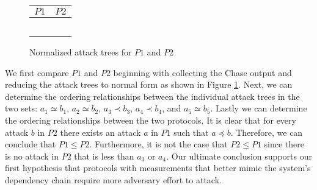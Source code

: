 \documentclass[runningheads]{llncs}
\theoremstyle{definition}
\begin{document}
\begin{figure}[h]
    \begin{center}
        \begin{tabular}{ M{6cm} | M{6cm} }
                $P1$ & $P2$ \\
                \hline
                &\\ 
                 \hspace{.03cm}  
                &  \hspace{.03cm}  \\ 
                &\\
                 \hspace{.03cm}  
                &    \\
                 
                 &  \\ 
            \end{tabular}
    \end{center}
    \caption{Normalized attack trees for $P1$ and $P2$}
    \label{fig:rtm-compare-reduced}
\end{figure}

We first compare $P1$ and $P2$ beginning with
collecting the Chase output and reducing the attack trees to normal
form as shown in Figure \ref{fig:rtm-compare-reduced}. Next, we can
determine the ordering relationships between the individual attack
trees in the two sets: $a_1 \simeq b_1$, $a_2 \simeq b_2$,
$a_3 \prec b_3$, $a_4 \prec b_4$, and $a_5 \simeq b_5$. Lastly we can
determine the ordering relationships between the two protocols. It is
clear that for every attack $b$ in $P2$ there exists an attack
$a$ in $P1$ such that $a \preceq b$. Therefore, we can conclude that
$P1 \leq P2$. Furthermore, it is not the case that $P2 \leq P1$ since
there is no attack in $P2$ that is less than $a_3$ or $a_4$. Our
ultimate conclusion supports our first hypothesis that protocols 
with measurements that better mimic the system's dependency chain 
require more adversary effort to attack.
\end{document}
